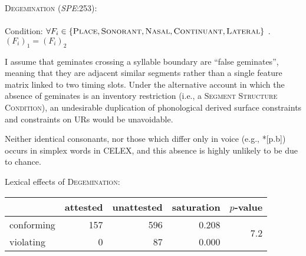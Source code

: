 \ex \textsc{Degemination} (\emph{SPE}:253): \\
\label{degem}
\\ 
Condition: $\forall F_i \in \{\textsc{Place}, \textsc{Sonorant}, \textsc{Nasal}, \textsc{Continuant}, \textsc{Lateral}\}$ . $(F_i)_1 = (F_i)_2$
\xe

\noindent
I assume that geminates crossing a syllable boundary are ``false geminates'', meaning that they are adjacent similar segments rather than a single feature matrix linked to two timing slots. Under the alternative account in which the absence of geminates is an inventory restriction (i.e., a \textsc{Segment Structure Condition}), an undesirable duplication of phonological derived surface constraints and constraints on URs would be unavoidable.

Neither identical consonants, nor those which differ only in voice (e.g., *[p.b]) occurs in simplex words in CELEX, and this absence is highly unlikely to be due to chance.

\ex Lexical effects of \textsc{Degemination}: \vspace{6pt} \\
\begin{tabular}{l r r r r}
\toprule
           & attested & unattested & saturation & $p$-value \\
\midrule
conforming & 157 & 596 & 0.208 & \multirow{2}{*}{7.2\e{-09}}\\
violating  &   0 &  87 & 0.000 \\
\bottomrule
\end{tabular}
\xe


